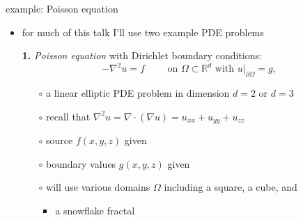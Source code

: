 \documentclass[hide notes,intlimits,usenames,dvipsnames]{beamer}
\newcommand{\RR}{\mathbb{R}}
\newcommand{\Div}{\nabla\cdot}
\newcommand{\grad}{\nabla}
\begin{document}
\begin{frame}{example: Poisson equation}

\begin{itemize}
\item for much of this talk I'll use two example PDE problems

\bigskip
\item[\textbf{1.}] \emph{Poisson equation} with Dirichlet boundary conditions:
	    $$- \grad^2 u = f \qquad \text{ on } \Omega \subset \RR^d \text{ with } u\big|_{\partial \Omega} = g,$$
    \vspace{-5mm}
	\begin{itemize}
	\item[$\circ$] a linear elliptic PDE problem in dimension $d=2$ or $d=3$
	\item[$\circ$] recall that $\grad^2 u = \Div \left(\grad u\right) = u_{xx}+u_{yy}+u_{zz}$
	\item[$\circ$] source $f(x,y,z)$ given
	\item[$\circ$] boundary values $g(x,y,z)$ given
	\item[$\circ$] will use various domains $\Omega$ including a square, a cube, and
		\begin{itemize}
        \item a snowflake fractal \hspace{0.3in} \begin{tikzpicture}[scale=1.2,baseline]  \end{tikzpicture}
        \end{itemize}
	\end{itemize}
\end{itemize}
\end{frame}
\end{document}

